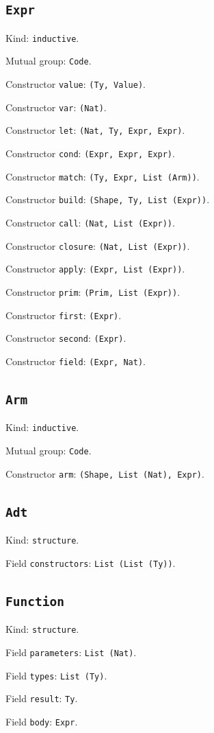 \documentclass[11pt]{article}
\begin{document}
\subsection*{\texttt{Expr}}
\noindent Kind: \texttt{inductive}.\par
\noindent Mutual group: \texttt{Code}.\par
\noindent Constructor \texttt{value}: \texttt{(Ty, Value)}.\par
\noindent Constructor \texttt{var}: \texttt{(Nat)}.\par
\noindent Constructor \texttt{let}: \texttt{(Nat, Ty, Expr, Expr)}.\par
\noindent Constructor \texttt{cond}: \texttt{(Expr, Expr, Expr)}.\par
\noindent Constructor \texttt{match}: \texttt{(Ty, Expr, List (Arm))}.\par
\noindent Constructor \texttt{build}: \texttt{(Shape, Ty, List (Expr))}.\par
\noindent Constructor \texttt{call}: \texttt{(Nat, List (Expr))}.\par
\noindent Constructor \texttt{closure}: \texttt{(Nat, List (Expr))}.\par
\noindent Constructor \texttt{apply}: \texttt{(Expr, List (Expr))}.\par
\noindent Constructor \texttt{prim}: \texttt{(Prim, List (Expr))}.\par
\noindent Constructor \texttt{first}: \texttt{(Expr)}.\par
\noindent Constructor \texttt{second}: \texttt{(Expr)}.\par
\noindent Constructor \texttt{field}: \texttt{(Expr, Nat)}.\par
\subsection*{\texttt{Arm}}
\noindent Kind: \texttt{inductive}.\par
\noindent Mutual group: \texttt{Code}.\par
\noindent Constructor \texttt{arm}: \texttt{(Shape, List (Nat), Expr)}.\par
\subsection*{\texttt{Adt}}
\noindent Kind: \texttt{structure}.\par
\noindent Field \texttt{constructors}: \texttt{List (List (Ty))}.\par
\subsection*{\texttt{Function}}
\noindent Kind: \texttt{structure}.\par
\noindent Field \texttt{parameters}: \texttt{List (Nat)}.\par
\noindent Field \texttt{types}: \texttt{List (Ty)}.\par
\noindent Field \texttt{result}: \texttt{Ty}.\par
\noindent Field \texttt{body}: \texttt{Expr}.\par
\end{document}
